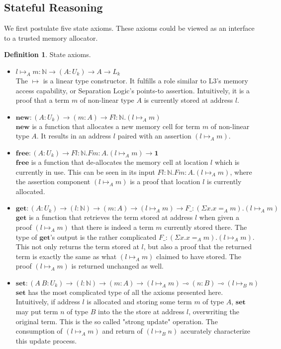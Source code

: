 \documentclass[sigplan,screen,review,authordraft]{acmart}
\theoremstyle{definition}
\newtheorem{definition}{Definition}[section]
\newcommand{\new}{\textbf{new}}
\newcommand{\free}{\textbf{free}}
\newcommand{\get}{\textbf{get}}
\newcommand{\set}{\textbf{set}}
\begin{document}
  \subsection{Stateful Reasoning}
  We first postulate five state axioms. These axioms could be viewed as an interface to a trusted memory allocator.
  \begin{definition}
    State axioms.
    \begin{itemize}
      \item $l \mapsto_A m : \mathbb{N} \rightarrow (A : U_k) \rightarrow A \rightarrow L_k$ \\
      The $\mapsto$ is a linear type constructor. It fulfills a role similar to L3's \cite{l3} memory access capability, or Separation Logic's \cite{reynolds02} points-to assertion. Intuitively, it is a proof that a term $m$ of non-linear type $A$ is currently stored at address $l$.
      \item $\new : (A : U_k) \rightarrow (m : A) \rightarrow F l:\mathbb{N}.(l \mapsto_A m)$ \\
      $\new$ is a function that allocates a new memory cell for term $m$ of non-linear type $A$. It results in an address $l$ paired with an assertion $(l \mapsto_A m)$.
      \item $\free : (A : U_k) \rightarrow F l:\mathbb{N}.F m:A.(l \mapsto_A m) \rightarrow \mathbf{1}$ \\
      $\free$ is a function that de-allocates the memory cell at location $l$ which is currently in use. This can be seen in its input $F l:\mathbb{N}.F m:A.(l \mapsto_A m)$, where the assertion component $(l \mapsto_A m)$ is a proof that location $l$ is currently allocated.
      \item $\get : (A : U_k) \rightarrow (l : \mathbb{N}) \rightarrow (m : A) \rightarrow (l \mapsto_A m) \rightarrow F \_: (\Sigma x. x =_A m). (l \mapsto_A m)$ \\
      $\get$ is a function that retrieves the term stored at address $l$ when given a proof $(l \mapsto_A m)$ that there is indeed a term $m$ currently stored there. The type of $\get$'s output is the rather complicated $F \_: (\Sigma x. x =_A m). (l \mapsto_A m)$. This not only returns the term stored at $l$, but also a proof that the returned term is exactly the same as what $(l \mapsto_A m)$ claimed to have stored. The proof $(l \mapsto_A m)$ is returned unchanged as well.
      \item $\set : (A\ B : U_k) \rightarrow (l : \mathbb{N}) \rightarrow (m : A) \rightarrow (l \mapsto_A m) \multimap (n : B) \multimap (l \mapsto_B n)$ \\
      $\set$ has the most complicated type of all the axioms presented here. Intuitively, if address $l$ is allocated and storing some term $m$ of type $A$, $\set$ may put term $n$ of type $B$ into the the store at address $l$, overwriting the original term. This is the so called "strong update" operation. The consumption of $(l \mapsto_A m)$ and return of $(l \mapsto_B n)$ accurately characterize this update process.
    \end{itemize}
  \end{definition}
\end{document}
